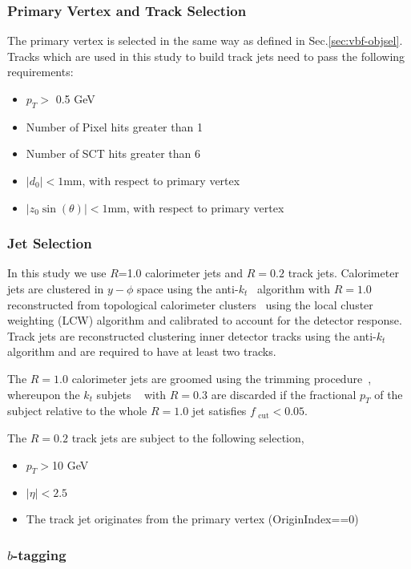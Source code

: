 \label{sec:gbb-obj}

\subsubsection{Primary Vertex and Track Selection}
The primary vertex is selected in the same way as defined in Sec.\ref{sec:vbf-objsel}.
Tracks which are used in this study to build track jets need to pass the following requirements:
\begin{itemize}
    \item $p_T>$ 0.5 GeV
    \item Number of Pixel hits greater than 1
    \item Number of SCT hits greater than 6
    \item $|d_0|<1$mm, with respect to primary vertex
    \item $|z_0\sin(\theta)|<1$mm, with respect to primary vertex
\end{itemize}

\subsubsection{Jet Selection}
In this study we use $R$=1.0 calorimeter jets and $R=0.2$ track jets. Calorimeter jets are clustered in $y-\phi$ space using the anti-$k_t$~\cite{Cacciari:2008gp} algorithm with $R=1.0$ reconstructed from topological calorimeter clusters~\cite{TopoClusters} using the local cluster weighting (LCW) algorithm \cite{EndcapTBelectronPion2002} and calibrated to account for the detector response. Track jets are reconstructed clustering inner detector tracks using the anti-$k_t$ algorithm and are required to have at least two tracks.

\noindent The $R = 1.0$ calorimeter jets are groomed using the trimming procedure~\cite{Krohn:2009th}, whereupon the $k_{t}$ subjets ~\cite{Cacciari200657} with $R=0.3$ are discarded if the fractional $p_{T}$ of the subject relative to the whole $R=1.0$ jet satisfies $f_\text{ cut}<0.05$.  

\noindent The $R=0.2$ track jets are subject to the following selection, 
\begin{itemize}
	\item $p_T>$10 GeV
	\item $|\eta|<2.5$	
	\item The track jet originates from the primary vertex (OriginIndex==0)
\end{itemize}

\subsubsection{$b$-tagging}

